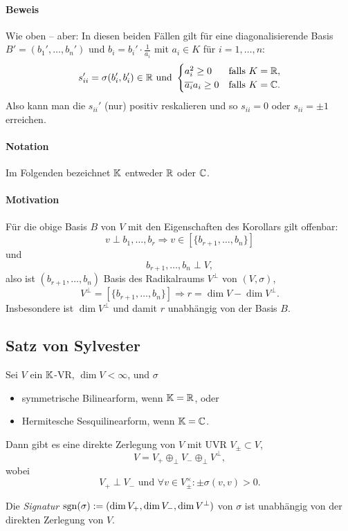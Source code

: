 \paragraph{Beweis}
	Wie oben -- aber:
	In diesen beiden Fällen gilt für eine diagonalisierende Basis $ B'=(b_1',\dots,b_n') $ und $ b_i = b_i'\cdot \frac{1}{a_i} $ mit $ a_i\in K $ für $ i=1,\dots,n $:
		\[ s_{ii}' = \sigma(b_i',b_i')\in \mathbb{R} \text{ und }
		\begin{cases}
			a_i^2 \geq 0 & \text{falls } K = \mathbb{R},\\
			\overline{a_i}a_i \geq 0 & \text{falls } K =\mathbb{C}.
		\end{cases} \]
	Also kann man die $ s_{ii}' $ (nur) positiv reskalieren und so $ s_{ii} = 0 $ oder $ s_{ii} = \pm 1 $ erreichen.
\paragraph{Notation}
	Im Folgenden bezeichnet $ \mathbb{K} $ entweder $ \mathbb{R} $ oder $ \mathbb{C} $.
\paragraph{Motivation}
	Für die obige Basis $ B $ von $ V $ mit den Eigenschaften des Korollars gilt offenbar:
		\[ v\perp b_1,\dots,b_r \Rightarrow v\in [\{b_{r+1},\dots,b_{n}\}] \]
	und
		\[ b_{r+1},\dots,b_n \perp V, \]
	also ist $ (b_{r+1},\dots,b_n) $ Basis des Radikalraums $ V^\perp $ von $ (V,\sigma) $,
		\[ V^\perp = [\{b_{r+1},\dots,b_n\} ] \Rightarrow r = \dim V-\dim V^\perp. \]
	Insbesondere ist $ \dim V^\perp $ und damit $ r $ unabhängig von der Basis $ B $.

\subsection{Satz von Sylvester}
\begin{Satz}	
	Sei $ V $ ein $ \mathbb{K} $-VR, $ \dim V <\infty $, und $ \sigma $
		\begin{itemize}
			\item symmetrische Bilinearform, wenn $ \mathbb{K}=\mathbb{R} $, oder
			\item Hermitesche Sesquilinearform, wenn $ \mathbb{K}=\mathbb{C} $.
		\end{itemize}
	Dann gibt es eine direkte Zerlegung von $ V $ mit UVR $ V_{\pm}\subset V $,
		\[ V= V_+ \oplus_\perp V_- \oplus_\perp V^\perp,  \]
	wobei
		\[ V_+ \perp V_- \text{ und } \forall v\in V^\times_\pm: \pm \sigma(v,v) > 0. \]
\end{Satz}
\begin{Definition}[Signatur]
	Die \emph{Signatur} $ \operatorname{sgn}(\sigma):= (\dim V_+,\dim V_-,\dim V^\perp) $ von $ \sigma $ ist unabhängig von der direkten Zerlegung von $ V $.
\end{Definition}
